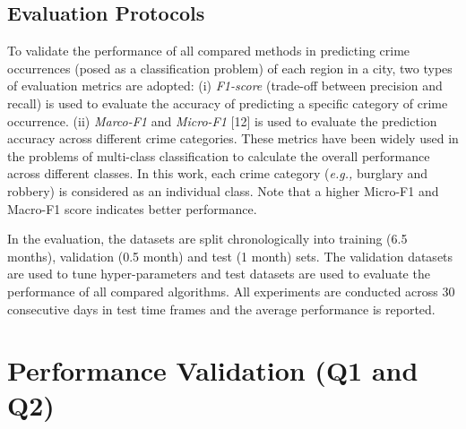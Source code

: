 \subsection{Evaluation Protocols}

To validate the performance of all
compared methods in predicting crime occurrences (posed as a
classification problem) of each region in a city, two types of
evaluation metrics are adopted: (i) \emph{F1-score} (trade-off between precision
and recall) is used to evaluate the accuracy of predicting a specific category
of crime occurrence. (ii) \emph{Marco-F1} and \emph{Micro-F1} [12] is used to
evaluate the prediction accuracy across different crime categories.
These metrics have been widely used in the problems of multi-class
classification to calculate the overall performance across different
classes. In this work, each crime category (\emph{e.g.,} burglary
and robbery) is considered as an individual class. Note that a higher Micro-F1
and Macro-F1 score indicates better performance.

In the evaluation, the datasets are split chronologically into
training (6.5 months), validation (0.5 month) and test (1 month)
sets. The validation datasets are used to tune hyper-parameters and
test datasets are used to evaluate the performance of all compared algorithms. All experiments are conducted across 30 consecutive
days in test time frames and the average performance is reported.

\section{Performance Validation (Q1 and Q2)}

